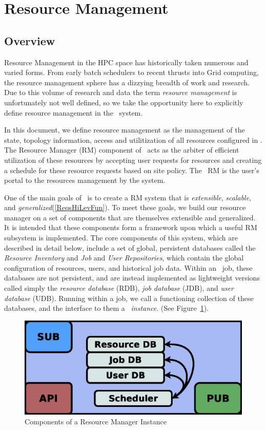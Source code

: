 \section{Resource Management}

\subsection{Overview}

Resource Management in the HPC space has historically taken
numerous and varied forms. From early batch schedulers to
recent thrusts into Grid computing, the resource management
sphere has a dizzying breadth of work and research. Due to this
volume of research and data the term {\em resource management} is
unfortunately not well defined, so we take the opportunity here
to explicitly define resource management in the \ngrm\ system.

In this document, we define resource management as the management
of the state, topology information, access and utilitization
of all resources configured in \ngrm. The Resource Manager (RM)
component of \ngrm\ acts as the arbiter of efficient utilization
of these resources by accepting user requests for resources and
creating a schedule for these resource requests based on site
policy. The \ngrm\ RM is the user's portal to the resources
management by the system.

One of the main goals of \ngrm\ is to create a RM system
that is {\em extensible}, {\em scalable}, and {\em
generalized}(\ref{ReqsHiLevFun}). To meet these goals, we
build our resource manager on a set of components that are
themselves extensible and generalized. It is intended that
these components form a framework upon which a useful RM
subsystem is implemented. The core components of this system,
which are described in detail below, include a set of global,
persistent databases called the {\em Resource Inventory} and
{\em Job} and {\em User Repositories}, which contain the global
configuration of resources, users, and historical job data. Within
an \ngrm\ job, these databases are not persistent, and are instead
implemented as lightweight versions called simply the {\em resource
database} (RDB), {\em job database} (JDB), and {\em user database}
(UDB). Running within a job, we call a functioning collection of
these databases, and the interface to them a \ngrm\ {\em instance}.
(See Figure~\ref{RMInstance}).


\begin{figure}
\centering
\includegraphics[scale=0.30]{../fig/RM-instance.eps}
\caption{Components of a Resource Manager Instance}
\label{RMInstance}
\end{figure}

